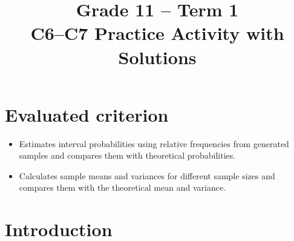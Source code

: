 \makeatletter
{}
\makeatother




\COneTonePracticePalette




\usepackage{longtable}

\setlength{\DistributionGraphWidth}{0.45\textwidth}
\setlength{\DistributionGraphHeight}{4cm}

\title{Grade 11 -- Term 1 \\ C6--C7 Practice Activity with Solutions}
\author{}
\date{}

\pagestyle{empty}




	\maketitle
	\setcounter{tocdepth}{1}
	\setcounter{secnumdepth}{2}
	\label{toc}
	\tableofcontents
	
	\section*{Evaluated criterion}
	\begin{itemize}
		\item [\textbf{C6.}] Estimates interval probabilities using relative frequencies from generated samples and compares them with theoretical probabilities.
		
		\item [\textbf{C7.}] Calculates sample means and variances for different sample sizes and compares them with the theoretical mean and variance.
		
		
	\end{itemize}
	
	\vspace{-4mm}
	

\section{Introduction}
\label{sec:c6-introduction}
